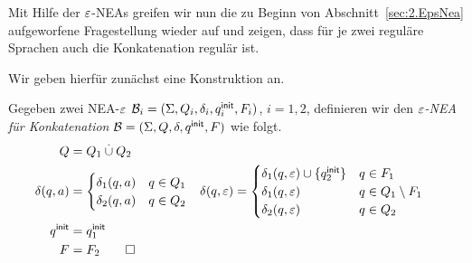 \medskip

Mit Hilfe der $\varepsilon$-NEAs greifen wir nun die zu Beginn von Abschnitt~\ref{sec:2.EpsNea} aufgeworfene Fragestellung wieder auf und zeigen, dass für je zwei reguläre Sprachen auch die Konkatenation regulär ist.

Wir geben hierfür zunächst eine Konstruktion an.

\begin{Def}
Gegeben zwei NEA-$\varepsilon$ $\mathcal{B}_i= (\Sigma, Q_i,\delta_i,q^\mathsf{init}_i,F_i)$, $i = 1,2$, definieren wir den \emph{$\varepsilon$-NEA für Konkatenation} $\mathcal{B}= (\Sigma, Q,\delta,q^\mathsf{init},F)$ wie folgt.
                \begin{align*}
                Q &= Q_1 \overset.\cup Q_2\\
                \delta(q,a) &=
                                \begin{cases}
                                        \delta_1(q,a) & q\in Q_1 \\
                                        \delta_2(q,a) & q\in Q_2
                                      \end{cases}&
                  \delta (q, \varepsilon) &=
                                     \begin{cases}
                                       \delta_1 (q,\varepsilon) \cup \{q^\mathsf{init}_2\} & q \in F_1 \\
                                       \delta_1 (q, \varepsilon) & q \in Q_1 \setminus F_1 \\
                                       \delta_2 (q, \varepsilon) & q \in Q_2
                                     \end{cases} \\
                q^\mathsf{init} & = q^\mathsf{init}_1\\
                F &= F_2 \qedhere
                \end{align*}
\end{Def}

